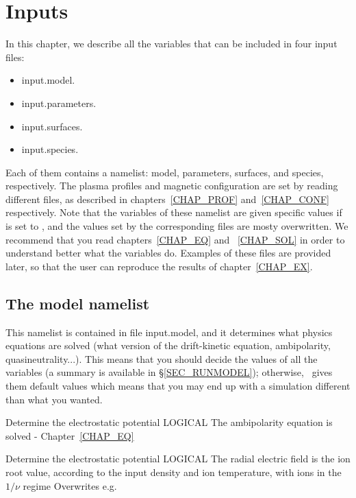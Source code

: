 \chapter{Inputs}\label{CHAP_INPUT}


In this chapter, we describe all the variables that can be included in four input files:
\begin{itemize}
\item {\ttfamily input.model}.
\item {\ttfamily input.parameters}.
\item {\ttfamily input.surfaces}.
\item {\ttfamily input.species}. 
\end{itemize}

Each of them contains a namelist: {\ttfamily model}, {\ttfamily parameters}, {\ttfamily surfaces}, and {\ttfamily species}, respectively. The plasma profiles and magnetic configuration are set by reading different files, as described in chapters~\ref{CHAP_PROF} and~\ref{CHAP_CONF} respectively. Note that the variables of these namelist are given specific values if  is set to \true, and the values set by the corresponding files are mosty overwritten. We recommend that you read chapters~\ref{CHAP_EQ} and ~\ref{CHAP_SOL} in order to understand better what the variables do. Examples of these files are provided later, so that the user can reproduce the results of chapter~\ref{CHAP_EX}.



\section{The {\ttfamily model} namelist}\label{SEC_MODEL}

This namelist is contained in file {\ttfamily input.model}, and it  determines what physics equations are solved (what version of the drift-kinetic equation, ambipolarity, quasineutrality...). This means that you should decide the values of all the variables (a summary is available in \S\ref{SEC_RUNMODEL}); otherwise, \KNOSOS~gives them default values which means that you may end up with a simulation different than what you wanted.

{Determine the electrostatic potential}
{LOGICAL}
{The ambipolarity equation is solved}
{\true}
{-}
{Chapter~\ref{CHAP_EQ}}

{Determine the electrostatic potential}
{LOGICAL}
{The radial electric field is the ion root value, according to the input density and ion temperature, with ions in the $1/\nu$ regime}
{\false}
{Overwrites }
{e.g. \citep{maassberg1999densitycontrol}}

